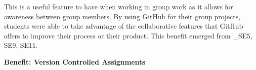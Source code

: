 This is a useful feature to have when working in group work as it allows for awareness between group members. By using GitHub for their group projects, students were able to take advantage of the collaborative features that GitHub offers to improve their process or their product. This benefit emerged from _{SE5, SE9, SE11}.







\textbf{Benefit: Version Controlled Assignments} \\


